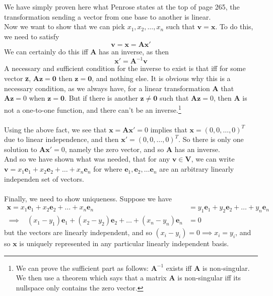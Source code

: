 We have simply proven here what Penrose states at the top of page 265, the transformation sending a vector from one base to another is linear.\\ Now we want to show that we can pick $x_1,x_2,\ldots,x_n$ such that $\mathbf{v}=\mathbf{x}$. To do this, we need to satisfy
$$\mathbf{v}=\mathbf{x}=\mathbf{A} \mathbf{x}'$$
We can certainly do this iff $\mathbf{A}$ has an inverse, as then $$\mathbf{x}'=\mathbf{A}^{-1} \mathbf{v}$$
A necessary and sufficient condition for the inverse to exist is that iff for some vector \textbf{z},  $\mathbf{A}\mathbf{z}=\mathbf{0}$ then $\mathbf{z}=\mathbf{0}$, and nothing else. It is obvious why this is a necessary condition, as we always have, for a linear transformation $\mathbf{A}$ that $\mathbf{A}\mathbf{z}=0$ when $\mathbf{z}=\mathbf{0}$. But if there is another $\mathbf{z}\neq\mathbf{0}$ such that $\mathbf{A}\mathbf{z}=0$, then $\mathbf{A}$ is not a one-to-one function, and there can't be an inverse.\footnote{We can prove the sufficient part as follows: $\mathbf{A}^{-1}$ exists iff $\mathbf{A}$ is non-singular. We then use a theorem which says that a matrix $\mathbf{A}$ is non-singular iff its nullspace only contains the zero vector.} \\ \\ Using the above fact, we see that 
$\mathbf{x}=\mathbf{A} \mathbf{x}'=0$ implies that $\mathbf{x}=(0,0,\ldots,0)^T$ due to linear independence, and then $\mathbf{x}'=(0,0,\ldots,0)^T$. So there is only one solution to $\mathbf{A} \mathbf{x}'=0$, namely the zero vector, and so $\mathbf{A}$ has an inverse.\\ And so we have shown what was needed, that for any $\mathbf{v}\in\mathbf{V}$, we can write $\mathbf{v}=x_1\mathbf{e}_1+x_2\mathbf{e}_2+\ldots +x_n\mathbf{e}_n$ for where $\mathbf{e}_1,\mathbf{e}_2,\ldots \mathbf{e}_n$ are an arbitrary linearly independen set of vectors.  \\ \\ Finally, we need to show uniqueness. Suppose we have
\begin{align*}
\mathbf{x}=x_1\mathbf{e}_1+x_2\mathbf{e}_2+\ldots +x_n\mathbf{e}_n&=y_1\mathbf{e}_1+y_2\mathbf{e}_2+\ldots +y_n\mathbf{e}_n\\
\implies\ \ \ \   (x_1-y_1)\mathbf{e}_1+(x_2-y_2)\mathbf{e}_2+\ldots +(x_n-y_n)\mathbf{e}_n&=0
\end{align*}
but the vectors are linearly independent, and so $(x_i-y_i)=0\implies x_i=y_i$, and so $\mathbf{x}$ is uniquely represented in any particular linearly independent basis.








